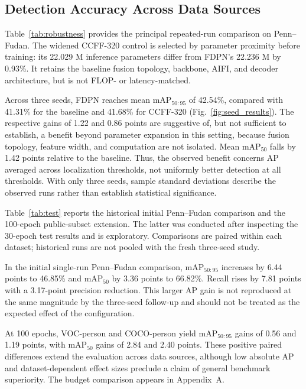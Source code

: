 \documentclass[journal]{IEEEtran}
\newcommand{\mapfifty}{mAP$_{50}$}
\newcommand{\mapcoco}{mAP$_{50:95}$}
\begin{document}
\subsection{Detection Accuracy Across Data Sources}
Table~\ref{tab:robustness} provides the principal repeated-run comparison on Penn--Fudan. The widened CCFF-320 control is selected by parameter proximity before training: its 22.029 M inference parameters differ from FDPN's 22.236 M by 0.93\%. It retains the baseline fusion topology, backbone, AIFI, and decoder architecture, but is not FLOP- or latency-matched.



Across three seeds, FDPN reaches mean \mapcoco{} of 42.54\%, compared with 41.31\% for the baseline and 41.68\% for CCFF-320 (Fig.~\ref{fig:seed_results}). The respective gains of 1.22 and 0.86 points are suggestive of, but not sufficient to establish, a benefit beyond parameter expansion in this setting, because fusion topology, feature width, and computation are not isolated. Mean \mapfifty{} falls by 1.42 points relative to the baseline. Thus, the observed benefit concerns AP averaged across localization thresholds, not uniformly better detection at all thresholds. With only three seeds, sample standard deviations describe the observed runs rather than establish statistical significance.

Table~\ref{tab:test} reports the historical initial Penn--Fudan comparison and the 100-epoch public-subset extension. The latter was conducted after inspecting the 30-epoch test results and is exploratory. Comparisons are paired within each dataset; historical runs are not pooled with the fresh three-seed study.



In the initial single-run Penn--Fudan comparison, \mapcoco{} increases by 6.44 points to 46.85\% and \mapfifty{} by 3.36 points to 66.82\%. Recall rises by 7.81 points with a 3.17-point precision reduction. This larger AP gain is not reproduced at the same magnitude by the three-seed follow-up and should not be treated as the expected effect of the configuration.

At 100 epochs, VOC-person and COCO-person yield \mapcoco{} gains of 0.56 and 1.19 points, with \mapfifty{} gains of 2.84 and 2.40 points. These positive paired differences extend the evaluation across data sources, although low absolute AP and dataset-dependent effect sizes preclude a claim of general benchmark superiority. The budget comparison appears in Appendix~A.
\end{document}
